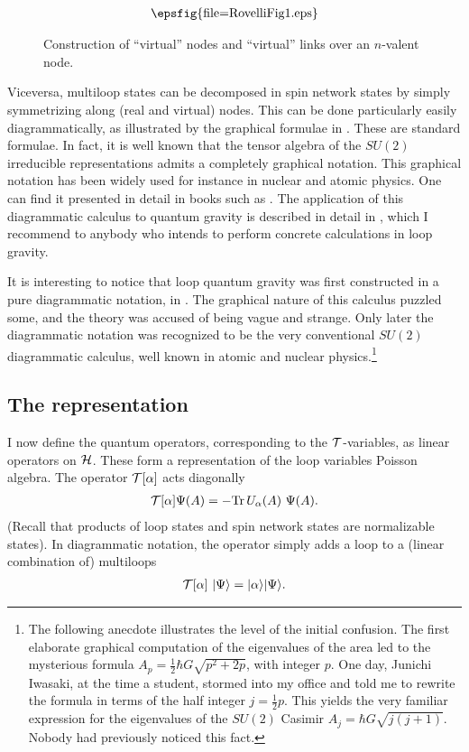 \begin{figure}
$$
\begin{array}{c}\mbox{\epsfig{file=RovelliFig1.eps}}\end{array}
$$
\caption{Construction of ``virtual'' nodes and ``virtual''
links over an $n$-valent node.}
\label{TheVirtualNode}
\end{figure}

Viceversa, multiloop states can be decomposed in spin network states 
by simply symmetrizing along (real and virtual) nodes.  This can be 
done particularly easily diagrammatically, as illustrated by the 
graphical formulae in \cite{RovelliSmolin95b,DePietriRovelli}.  These 
are standard formulae.  In fact, it is well known that the tensor 
algebra of the $SU(2)$ irreducible representations admits a completely 
graphical notation.  This graphical notation has been widely used for 
instance in nuclear and atomic physics.  One can find it presented in 
detail in books such as 
\cite{GraphMethods,GraphMethods2,GraphMethods3}.  The application of 
this diagrammatic calculus to quantum gravity is described in detail 
in \cite{DePietriRovelli}, which I recommend to anybody who intends to 
perform concrete calculations in loop gravity.

It is interesting to notice that loop quantum gravity was first 
constructed in a pure diagrammatic notation, in 
\cite{RovelliSmolin90}.  The graphical nature of this calculus 
puzzled some, and the theory was accused of being vague and 
strange.  Only later the diagrammatic notation was recognized to 
be the very conventional $SU(2)$ diagrammatic calculus, well 
known in atomic and nuclear physics.\footnote{The following 
anecdote illustrates the level of the initial confusion.  The 
first elaborate graphical computation of the eigenvalues of the 
area led to the mysterious formula $A_{p}=\frac{1}{2}\hbar G 
\sqrt{p^{2}+2p}$, with integer $p$.  One day, Junichi Iwasaki, at 
the time a student, stormed into my office and told me to rewrite 
the formula in terms of the half integer $j=\frac{1}{2}p$.  This 
yields the very familiar expression for the 
eigenvalues of the $SU(2)$ Casimir $A_{j}=\hbar G \sqrt{j(j+1)}$.  
Nobody had previously noticed this fact.}

\subsection{The representation}

I now define the quantum operators, corresponding to the
$\cal T$-variables, as linear operators on $\cal H$. These
form a representation of the loop variables Poisson algebra.
The operator ${\cal T}[\alpha]$ acts diagonally 
\begin{eqnarray}
 {\cal T}[\alpha] \Psi(A)  = - \mathrm{Tr}\, U_{\alpha}(A)\ \Psi(A).
\end{eqnarray} 
(Recall that products of loop states and spin network states are
normalizable states). In diagrammatic notation, the operator 
simply adds a loop to a (linear combination of) multiloops
\begin{eqnarray}
 {\cal T}[\alpha]\ |\Psi\rangle  = |\alpha\rangle |\Psi\rangle. 
 \label{t00}
\end{eqnarray} 

